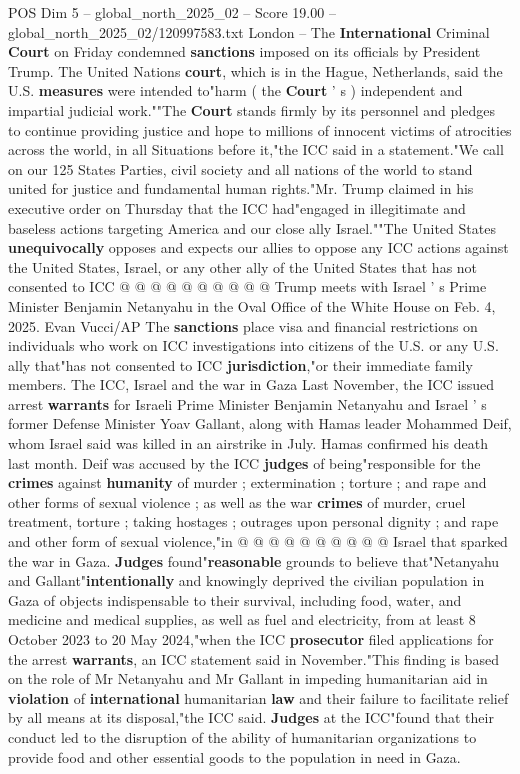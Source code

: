 \begin{textsample}{POS Dim 5 – global\_north\_2025\_02 – Score 19.00 – global\_north\_2025\_02/120997583.txt}  \label{ex:f5_pos_331}
London -- The \textbf{International} Criminal \textbf{Court} on Friday condemned \textbf{sanctions} imposed on its officials by President Trump.
The United Nations \textbf{court}, which is in the Hague, Netherlands, said the U.S. \textbf{measures} were intended to"harm ( the \textbf{Court} ' s ) independent and impartial judicial work.""The \textbf{Court} stands firmly by its personnel and pledges to continue providing justice and hope to millions of innocent victims of atrocities across the world, in all Situations before it,"the ICC said in a statement."We call on our 125 States Parties, civil society and all nations of the world to stand united for justice and fundamental human rights."Mr.
Trump claimed in his executive order on Thursday that the ICC had"engaged in illegitimate and baseless actions targeting America and our close ally Israel.""The United States \textbf{unequivocally} opposes and expects our allies to oppose any ICC actions against the United States, Israel, or any other ally of the United States that has not consented to ICC @ @ @ @ @ @ @ @ @ @ Trump meets with Israel ' s Prime Minister Benjamin Netanyahu in the Oval Office of the White House on Feb. 4, 2025.
Evan Vucci/AP The \textbf{sanctions} place visa and financial restrictions on individuals who work on ICC investigations into citizens of the U.S. or any U.S. ally that"has not consented to ICC \textbf{jurisdiction},"or their immediate family members.
The ICC, Israel and the war in Gaza Last November, the ICC issued arrest \textbf{warrants} for Israeli Prime Minister Benjamin Netanyahu and Israel ' s former Defense Minister Yoav Gallant, along with Hamas leader Mohammed Deif, whom Israel said was killed in an airstrike in July.
Hamas confirmed his death last month.
Deif was accused by the ICC \textbf{judges} of being"responsible for the \textbf{crimes} against \textbf{humanity} of murder ; extermination ; torture ; and rape and other forms of sexual violence ; as well as the war \textbf{crimes} of murder, cruel treatment, torture ; taking hostages ; outrages upon personal dignity ; and rape and other form of sexual violence,"in @ @ @ @ @ @ @ @ @ @ Israel that sparked the war in Gaza. \textbf{Judges} found"\textbf{reasonable} grounds to believe that"Netanyahu and Gallant"\textbf{intentionally} and knowingly deprived the civilian population in Gaza of objects indispensable to their survival, including food, water, and medicine and medical supplies, as well as fuel and electricity, from at least 8 October 2023 to 20 May 2024,"when the ICC \textbf{prosecutor} filed applications for the arrest \textbf{warrants}, an ICC statement said in November."This finding is based on the role of Mr Netanyahu and Mr Gallant in impeding humanitarian aid in \textbf{violation} of \textbf{international} humanitarian \textbf{law} and their failure to facilitate relief by all means at its disposal,"the ICC said. \textbf{Judges} at the ICC"found that their conduct led to the disruption of the ability of humanitarian organizations to provide food and other essential goods to the population in need in Gaza.

\end{textsample}
